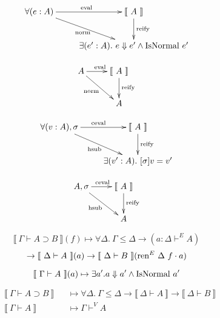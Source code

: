 \documentclass[preprint,nonatbib]{sigplanconf}
\def\dfn{\mapsto}
\def\bigstep{\Downarrow}
\def\arr{\supset}
\def\marr{\rightarrow}
\def\app{\cdot}
\newcommand{\el}[1]{\llbracket ~ #1 ~ \rrbracket}
\newcommand{\fun}[1]{\textmd{#1}}
\newcommand{\typm}[1]{\el{\Gamma \vdash #1}}
\newcommand{\dtypm}[1]{\el{\Delta \vdash #1}}
\newcommand{\dtype}[1]{\Delta \vdash^E #1}
\newcommand{\typv}[1]{\Gamma \vdash^V #1}
\newcommand{\dtypv}[1]{\Delta \vdash^V #1}
\newcommand{\ren}[1]{\Gamma \le #1}
\def\dren{\ren{\Delta}}
\newcommand{\env}[1]{\Gamma \sqsubseteq #1}
\def\denv{\env{\Delta}}
\begin{document}
\begin{displaymath}
    \xymatrix{
          {\forall (e : A)} 
          \ar[dr]_{\fun{norm}}
          \ar[r]^{\fun{eval}}
        & {\el{A}}
          \ar[d]^{\large{\fun{reify}}}
\\      & {\exists (e' : A). ~ e \bigstep e' \wedge \fun{IsNormal} ~ e'} }
\end{displaymath}

\begin{displaymath}
    \xymatrix{
          {A} 
          \ar[dr]_{\fun{norm}}
          \ar[r]^{\fun{eval}}
        & {\el{A}}
          \ar[d]^{\large{\fun{reify}}}
\\      & {A} }
\end{displaymath}


\begin{displaymath}
    \xymatrix{
          {\forall (v : A), \sigma} 
          \ar[dr]_{\fun{hsub}}
          \ar[r]^{\fun{ceval}}
        & {\el{A}}
          \ar[d]^{\large{\fun{reify}}}
\\      & {\exists (v' : A). ~ [ \sigma ] v = v'} }
\end{displaymath}

\begin{displaymath}
    \xymatrix{
          {A, \sigma} 
          \ar[dr]_{\fun{hsub}}
          \ar[r]^{\fun{ceval}}
        & {\el{A}}
          \ar[d]^{\large{\fun{reify}}}
\\      & {A} }
\end{displaymath}

$$
\typm{A \arr B}(f) \dfn \forall \Delta.~ \dren \marr (a : \dtype{A})
$$
$$
\marr \dtypm{A}(a) \marr \dtypm{B}(\fun{ren}^E ~ \Delta ~ f \app a)
$$

$$
\typm{A}(a) \dfn \exists a'. a \bigstep a' \wedge \fun{IsNormal} ~ a'
$$


\begin{align*}
&\typm{A \arr B}& &\dfn \forall \Delta.~ \dren \marr \dtypm{A} \marr \dtypm{B} \\
&\typm{A}& &\dfn \typv{A}
\end{align*}




\end{document}
